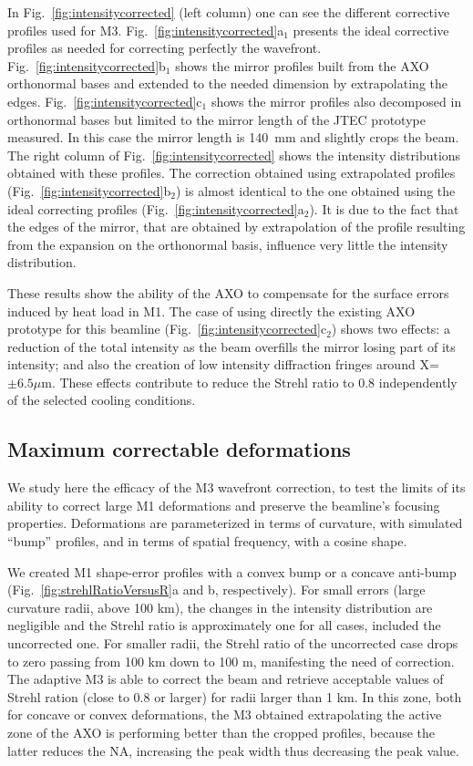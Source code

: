 \documentclass[preprint]{iucr}
\begin{document}
In Fig.~\ref{fig:intensitycorrected} (left column) one can see the different corrective profiles used for M3. 
Fig.~\ref{fig:intensitycorrected}a$_1$ presents the ideal corrective profiles as needed for correcting perfectly the wavefront. Fig.~\ref{fig:intensitycorrected}b$_1$ shows the mirror profiles built from the AXO orthonormal bases and extended to the needed dimension by extrapolating the edges. Fig.~\ref{fig:intensitycorrected}c$_1$ shows the mirror profiles also decomposed in orthonormal bases but limited to the mirror length of the JTEC prototype measured. In this case the mirror length is 140~mm and slightly crops the beam.
The right column of Fig.~\ref{fig:intensitycorrected} shows the intensity distributions obtained with these profiles.
The correction obtained using extrapolated profiles (Fig.~\ref{fig:intensitycorrected}b$_2$) is almost identical to the one obtained using the ideal correcting profiles (Fig.~\ref{fig:intensitycorrected}a$_2$). It is due to the fact that the edges of the mirror, that are obtained by extrapolation of the profile resulting from the expansion on the orthonormal basis, influence very little the intensity distribution.

These results show the ability of the AXO to compensate for the surface errors induced by heat load in M1. The case of using directly the existing AXO prototype for this beamline (Fig.~\ref{fig:intensitycorrected}c$_2$) shows two effects: a reduction of the total intensity as the beam overfills the mirror losing part of its intensity; and also the creation of low intensity diffraction fringes around X=$\pm6.5\mu$m. These effects contribute to reduce the Strehl ratio to 0.8 independently of the selected cooling conditions.


\subsection{Maximum correctable deformations}
\label{sec:scans}

We study here the efficacy of the M3 wavefront correction, to test the limits of its ability to correct large M1 deformations and preserve the beamline's focusing properties. Deformations are parameterized in terms of curvature, with simulated ``bump'' profiles, and in terms of spatial frequency, with a cosine shape.

We created M1 shape-error profiles with a convex bump or a concave anti-bump (Fig.~\ref{fig:strehlRatioVersusR}a and b, respectively). For small errors (large curvature radii, above 100 km), the changes in the intensity distribution are negligible and the Strehl ratio is approximately one for all cases, included the uncorrected one. For smaller radii, the Strehl ratio of the uncorrected case drops to zero passing from 100 km down to 100 m, manifesting the need of correction. The adaptive M3 is able to correct the beam and retrieve acceptable values of Strehl ration (close to 0.8 or larger) for radii larger than 1 km. In this zone, both for concave or convex deformations, the M3 obtained extrapolating the active zone of the AXO is performing better than the cropped profiles, because the latter reduces the NA, increasing the peak width thus decreasing the peak value. 
\end{document}
